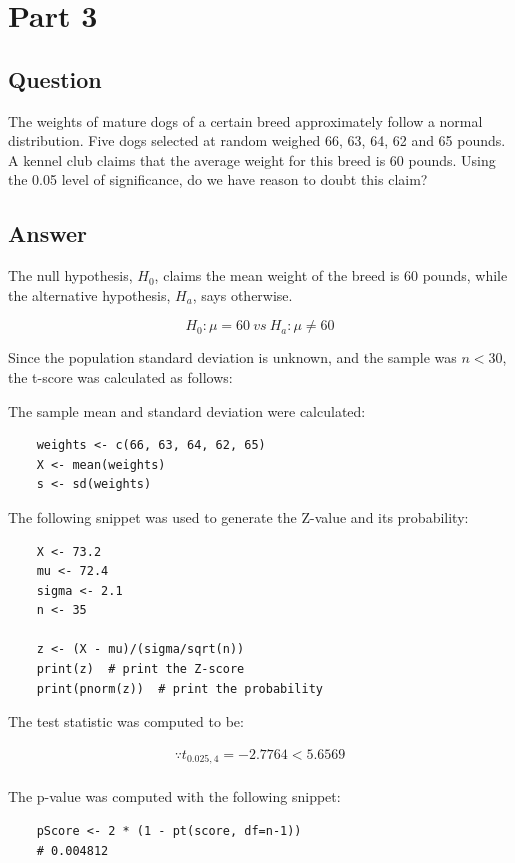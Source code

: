 \section{Part 3}
    \subsection{Question}
    The weights of mature dogs of a certain breed approximately follow a normal distribution. Five dogs selected at random weighed 66, 63, 64, 62 and 65 pounds. A kennel club claims that the average weight for this breed is 60 pounds. Using the 0.05 level of significance, do we have reason to doubt this claim?

    \subsection{Answer}
    The null hypothesis, $H_{0}$, claims the mean weight of the breed is 60 pounds, while the alternative hypothesis, $H_{a}$, says otherwise.

        \[ H_{0}: \mu = 60 \ vs \ H_{a}: \mu \neq 60 \]

    Since the population standard deviation is unknown, and the sample was $n < 30$, the t-score was calculated as follows:

    The sample mean and standard deviation were calculated:
\begin{lstlisting}
    weights <- c(66, 63, 64, 62, 65)
    X <- mean(weights)
    s <- sd(weights)
\end{lstlisting}

        


    The following snippet was used to generate the Z-value and its probability:
\begin{lstlisting}
    X <- 73.2
    mu <- 72.4
    sigma <- 2.1
    n <- 35

    z <- (X - mu)/(sigma/sqrt(n))
    print(z)  # print the Z-score
    print(pnorm(z))  # print the probability
\end{lstlisting}

    The test statistic was computed to be:

        \begin{align*}
            \because t_{0.025,4}=-2.7764 < 5.6569\\
        \end{align*}

    The p-value was computed with the following snippet:
\begin{lstlisting}
    pScore <- 2 * (1 - pt(score, df=n-1))
    # 0.004812
\end{lstlisting}

